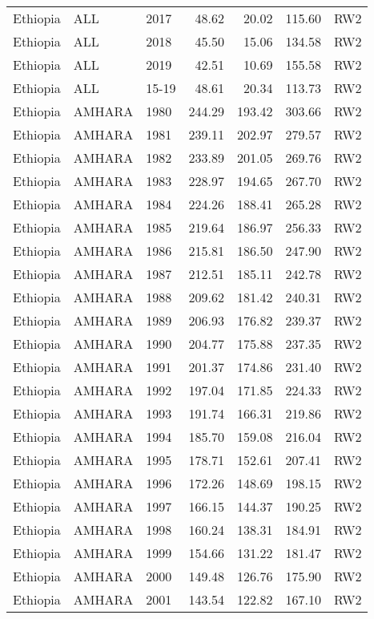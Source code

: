 \begin{longtable}{lllrrrl}
  Ethiopia & ALL & 2017 & 48.62 & 20.02 & 115.60 & RW2 \\ 
  Ethiopia & ALL & 2018 & 45.50 & 15.06 & 134.58 & RW2 \\ 
  Ethiopia & ALL & 2019 & 42.51 & 10.69 & 155.58 & RW2 \\ 
  Ethiopia & ALL & 15-19 & 48.61 & 20.34 & 113.73 & RW2 \\ 
  Ethiopia & AMHARA & 1980 & 244.29 & 193.42 & 303.66 & RW2 \\ 
  Ethiopia & AMHARA & 1981 & 239.11 & 202.97 & 279.57 & RW2 \\ 
  Ethiopia & AMHARA & 1982 & 233.89 & 201.05 & 269.76 & RW2 \\ 
  Ethiopia & AMHARA & 1983 & 228.97 & 194.65 & 267.70 & RW2 \\ 
  Ethiopia & AMHARA & 1984 & 224.26 & 188.41 & 265.28 & RW2 \\ 
  Ethiopia & AMHARA & 1985 & 219.64 & 186.97 & 256.33 & RW2 \\ 
  Ethiopia & AMHARA & 1986 & 215.81 & 186.50 & 247.90 & RW2 \\ 
  Ethiopia & AMHARA & 1987 & 212.51 & 185.11 & 242.78 & RW2 \\ 
  Ethiopia & AMHARA & 1988 & 209.62 & 181.42 & 240.31 & RW2 \\ 
  Ethiopia & AMHARA & 1989 & 206.93 & 176.82 & 239.37 & RW2 \\ 
  Ethiopia & AMHARA & 1990 & 204.77 & 175.88 & 237.35 & RW2 \\ 
  Ethiopia & AMHARA & 1991 & 201.37 & 174.86 & 231.40 & RW2 \\ 
  Ethiopia & AMHARA & 1992 & 197.04 & 171.85 & 224.33 & RW2 \\ 
  Ethiopia & AMHARA & 1993 & 191.74 & 166.31 & 219.86 & RW2 \\ 
  Ethiopia & AMHARA & 1994 & 185.70 & 159.08 & 216.04 & RW2 \\ 
  Ethiopia & AMHARA & 1995 & 178.71 & 152.61 & 207.41 & RW2 \\ 
  Ethiopia & AMHARA & 1996 & 172.26 & 148.69 & 198.15 & RW2 \\ 
  Ethiopia & AMHARA & 1997 & 166.15 & 144.37 & 190.25 & RW2 \\ 
  Ethiopia & AMHARA & 1998 & 160.24 & 138.31 & 184.91 & RW2 \\ 
  Ethiopia & AMHARA & 1999 & 154.66 & 131.22 & 181.47 & RW2 \\ 
  Ethiopia & AMHARA & 2000 & 149.48 & 126.76 & 175.90 & RW2 \\ 
  Ethiopia & AMHARA & 2001 & 143.54 & 122.82 & 167.10 & RW2 \\ 

\end{longtable}
